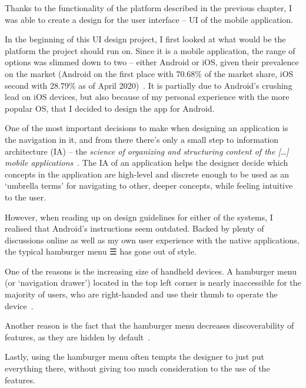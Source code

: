 Thanks to the functionality of the platform described in the previous chapter, I was able to create a design for the user interface -- UI of the mobile application.

In the beginning of this UI design project, I first looked at what would be the platform the project should run on.
Since it is a mobile application, the range of options was slimmed down to two -- either Android or iOS,
given their prevalence on the market (Android on the first place with 70.68\% of the market share, iOS second with 28.79\% as of April 2020)~\cite{market-share-mobile-os}.
It is partially due to Android's crushing lead on iOS devices, but also because of my personal experience with the more popular OS, that I decided to design the app for Android.

One of the most important decisions to make when designing an application is the navigation in it, and from there there's only a small step to information architecture (IA) -- the \textit{science of organizing and structuring content of the [\dots] mobile applications}~\cite{information-architecture}.
The IA of an application helps the designer decide which concepts in the application are high-level and discrete enough
to be used as an `umbrella terms' for navigating to other, deeper concepts, while feeling intuitive to the user.

However, when reading up on design guidelines for either of the systems, I realised that Android's instructions seem outdated.
Backed by plenty of discussions online as well as my own user experience with the native applications, the typical hamburger menu ☰ has gone out of style.

One of the reasons is the increasing size of handheld devices.
A hamburger menu (or `navigation drawer') located in the top left corner is nearly inaccessible for the majority of users, who are right-handed and use their thumb to operate the device~\cite{thumb-zone-article}.

Another reason is the fact that the hamburger menu decreases discoverability of features, as they are hidden by default~\cite{hamburger-discoverabillity}.

Lastly, using the hamburger menu often tempts the designer to just put everything there, without giving too much consideration to the use of the features.

